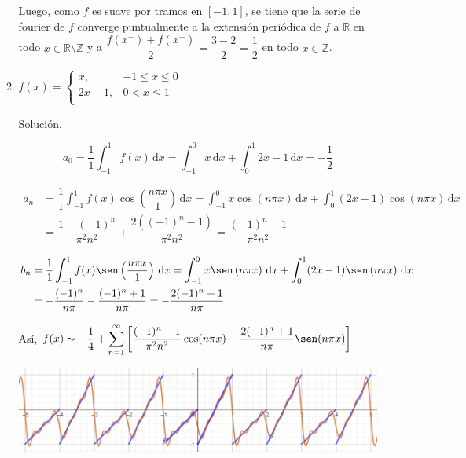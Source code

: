 \documentclass[fleqn]{article}
\newcommand{\real}{\mathbb{R}}
\newcommand{\ent}{\mathbb{Z}}
\newcommand{\intg}[3]{\int_{#1}^{#2} #3 \, \mathrm{d}x}
\begin{document}
\begin{enumerate}[I.]
\begin{enumerate}[(1)]
			Luego, como $f$ es suave por tramos en $ [-1,1] $, se tiene que la serie de fourier de $f$ converge puntualmente a la extensión periódica de $f$ a $ \real $ en todo $ x \in \real \setminus \ent $ y a $ \dfrac{f(x^-) + f(x^+)}{2} = \dfrac{3-2}{2} = \dfrac{1}{2} $ en todo $ x \in \ent $.

			\bfseries 
			\item $ f(x) = \begin{cases}
				x, & -1 \leq x \leq 0 \\
				2x - 1, & 0 < x \leq 1 \\
			\end{cases} $

			Solución.

			\normalfont

			\begin{equation*}
				a_0 = \dfrac{1}{1} \intg{-1}{1}{f(x)} = \intg{-1}{0}{x} + \intg{0}{1}{2x - 1} = -\dfrac{1}{2}
			\end{equation*}

			\begin{align*}
				a_n &= \dfrac{1}{1} \intg{-1}{1}{f(x) \cos \left( \dfrac{n \pi x}{1} \right)} = \intg{-1}{0}{x \cos \left(n \pi x \right)} + \intg{0}{1}{(2x - 1) \cos \left(n \pi x \right)} \\
				&= \dfrac{1 - (-1)^n}{\pi^2 n^2} + \dfrac{2((-1)^n - 1)}{\pi^2 n^2} = \dfrac{(-1)^n - 1}{\pi^2 n^2} 
			\end{align*}

			\begin{align*}
				b_n &= \dfrac{1}{1} \intg{-1}{1}{f(x) \sen \left( \dfrac{n \pi x}{1} \right)} = \intg{-1}{0}{x \sen \left(n \pi x \right)} + \intg{0}{1}{(2x - 1) \sen \left(n \pi x \right)} \\
				&= -\dfrac{(-1)^n}{n \pi} - \dfrac{(-1)^n + 1}{n \pi} = - \dfrac{2(-1)^n + 1}{n \pi}
			\end{align*}

			Así, $ \displaystyle f(x) \sim -\dfrac{1}{4} + \sum_{n=1}^{\infty} \left[ \dfrac{(-1)^n - 1}{\pi^2 n^2} \cos (n \pi x) - \dfrac{2(-1)^n + 1}{n \pi} \sen (n \pi x) \right] $

			\includegraphics[width=\linewidth]{Ejer2.png}


\end{enumerate}
\end{enumerate}
\end{document}
